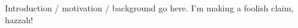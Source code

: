 Introduction / motivation / background go here. I'm making a foolish claim\cite{rosenblatt1956central}, hazzah!
